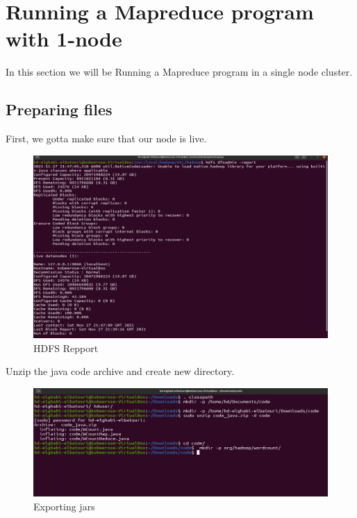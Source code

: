 \chapter{Running a Mapreduce program with 1-node}
\par In this section we will be Running a Mapreduce program in a single node cluster.
\begin{spacing}{1.2}
\section{Preparing files}

\par First, we gotta make sure that our node is live.
\\
\begin{figure}[!htb] 
\begin{center} 
\includegraphics[width=1\linewidth]{Big_Data/Hadoop/1-Node Map_Reduce/HDFS Repport} 
\end{center} 
\caption{HDFS Repport} 
\end{figure} 
\FloatBarrier



\par Unzip the java code archive and create new directory.
\\
\begin{figure}[!htb] 
\begin{center} 
\includegraphics[width=1\linewidth]{Big_Data/Hadoop/1-Node Map_Reduce/Exporting jars} 
\end{center} 
\caption{Exporting jars} 
\end{figure} 
\FloatBarrier


\end{spacing}
